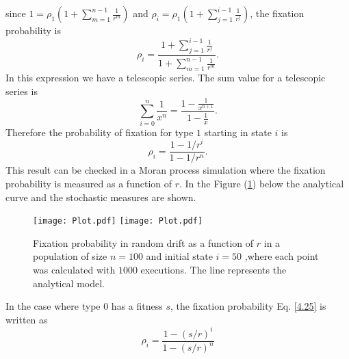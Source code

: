 since $1=\rho_1 (1+\sum_{m=1}^{n-1}\frac{1}{r^{m}} )$ and $\rho_i=\rho_1 (1+\sum_{j=1}^{i-1}\frac{1}{r^{j}} )$, the fixation probability is
\begin{equation}
\rho_{i}=\frac{1+\sum_{j=1}^{i-1}\frac{1}{r^j}}{1+\sum_{m=1}^{n-1}\frac{1}{r^m}}.
\end{equation}
In this expression we have a telescopic series. The sum value for a telescopic series is
\begin{equation}
\sum_{i=0}^{n}\frac{1}{x^n}=\frac{1-\frac{1}{x^{n+1}}}{1-\frac{1}{x}}.
\end{equation}  
Therefore the probability of fixation for type $1$ starting in state $i$ is
\begin{equation}\label{4.25}
\rho_i = \frac{1-1/r^i}{1-1/r^n}.
\end{equation}
This result can be checked in a Moran process simulation where  the fixation probability is measured as a function of $r$. In the Figure (\ref{Fig48}) below  the analytical curve and the stochastic measures are shown.
\begin{figure}[H]
  \begin{center}
    \leavevmode
    \ifpdf
      \texttt{[image: Plot.pdf]}
    \else
      \texttt{[image: Plot.pdf]}
    \fi
    \caption{Fixation probability in random drift as a function of $r$ in a population of size $n=100$ and initial state $i=50$ ,where each point was calculated with $1000$ executions. The line represents the analytical model.}
    \label{Fig48}
  \end{center}
  \end{figure}
In the case where type $0$ has a fitness $s$, the fixation probability Eq. \eqref{4.25} is written as
\begin{equation}
\rho_i = \frac{1-(s/r)^i}{1-(s/r)^n}
\end{equation}
